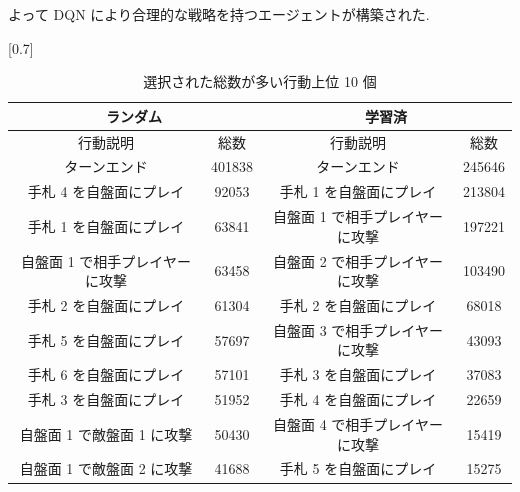 \documentclass[12pt]{jarticle}
\begin{document}
  よって DQN により合理的な戦略を持つエージェントが構築された.
  \begin{table}[t]
    \centering
    \caption{選択された総数が多い行動上位 10 個}
    \vspace{-0.3cm}
    \label{table:actioncount}
    \scalebox{0.7}[0.7]{
      \begin{tabular}{|cc|cc|}
        \hline
        \multicolumn{2}{|c|}{ランダム}      & \multicolumn{2}{c|}{学習済}       \\ \hline
        \multicolumn{1}{|c|}{行動説明} & 総数 & \multicolumn{1}{c|}{行動説明} & 総数 \\ \hline \hline
        \multicolumn{1}{|c|}{ターンエンド}    & 401838  & \multicolumn{1}{c|}{ターンエンド}    & 245646  \\ \hline
        \multicolumn{1}{|c|}{手札 4 を自盤面にプレイ}    &  92053  & \multicolumn{1}{c|}{手札 1 を自盤面にプレイ}    & 213804  \\ \hline
        \multicolumn{1}{|c|}{手札 1 を自盤面にプレイ}    & 63841  & \multicolumn{1}{c|}{自盤面 1 で相手プレイヤーに攻撃}    & 197221  \\ \hline
        \multicolumn{1}{|c|}{自盤面 1 で相手プレイヤーに攻撃}    & 63458  & \multicolumn{1}{c|}{自盤面 2 で相手プレイヤーに攻撃}    & 103490  \\ \hline
        \multicolumn{1}{|c|}{手札 2 を自盤面にプレイ}    & 61304  & \multicolumn{1}{c|}{手札 2 を自盤面にプレイ}    & 68018  \\ \hline
        \multicolumn{1}{|c|}{手札 5 を自盤面にプレイ}    & 57697  & \multicolumn{1}{c|}{自盤面 3 で相手プレイヤーに攻撃}    & 43093  \\ \hline
        \multicolumn{1}{|c|}{手札 6 を自盤面にプレイ}    & 57101  & \multicolumn{1}{c|}{手札 3 を自盤面にプレイ}    & 37083  \\ \hline
        \multicolumn{1}{|c|}{手札 3 を自盤面にプレイ}    & 51952  & \multicolumn{1}{c|}{手札 4 を自盤面にプレイ}    & 22659  \\ \hline
        \multicolumn{1}{|c|}{自盤面 1 で敵盤面 1 に攻撃}    & 50430  & \multicolumn{1}{c|}{自盤面 4 で相手プレイヤーに攻撃}    & 15419  \\ \hline
     
        \multicolumn{1}{|c|}{自盤面 1 で敵盤面 2 に攻撃}    & 41688  & \multicolumn{1}{c|}{手札 5 を自盤面にプレイ}    & 15275  \\ \hline
        \end{tabular}
    }
  \end{table}
\end{document}

